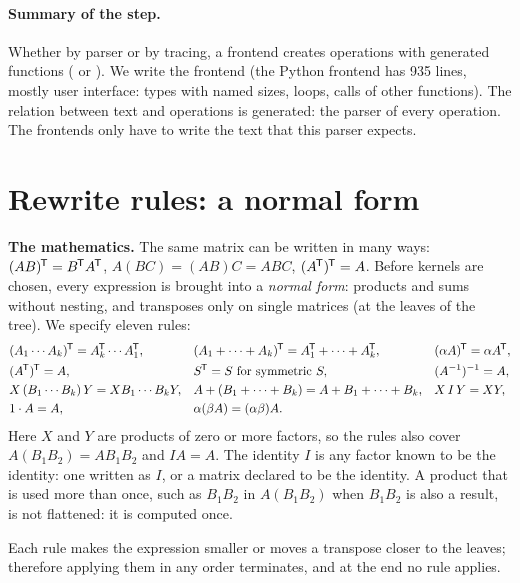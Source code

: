 \documentclass[11pt,a4paper]{article}
\newcommand{\T}{^{\mkern-1.5mu\mathsf{T}}}
\newcommand{\inv}{^{-1}}
\let\origtexttt\texttt
\renewcommand{\texttt}[1]{\highLight[ttbg]{\origtexttt{#1}}}
\newenvironment{maths}{\par\medskip\noindent\begin{minipage}{\linewidth}%
  \setlength{\parskip}{\medskipamount}\sffamily\small
  \textbf{The mathematics.}\enspace}{\end{minipage}\par\medskip}
\begin{document}
\paragraph{Summary of the step.}
Whether by parser or by tracing, a frontend creates operations with
generated functions (\texttt{create} or \texttt{parse}). We write the
frontend (the Python frontend has 935 lines, mostly user interface: types
with named sizes, loops, calls of other functions). The relation between
text and operations is generated: the parser of every operation. The
frontends only have to write the text that this parser expects.

\section{Rewrite rules: a normal form}
\label{sec:rules}

\begin{maths}
The same matrix can be written in many ways: \((AB)\T = B\T A\T\), \(A(BC) =
(AB)C = ABC\), \((A\T)\T = A\). Before kernels are chosen, every expression
is brought into a \emph{normal form}: products and sums without nesting,
and transposes only on single matrices (at the leaves of the tree). We
specify eleven rules:
\begin{align*}
&(A_1\cdots A_k)\T = A_k\T\cdots A_1\T, &&
(A_1+\dots+A_k)\T = A_1\T+\dots+A_k\T, &&
(\alpha A)\T = \alpha A\T,\\
&(A\T)\T = A, && S\T = S \text{ for symmetric } S, && (A\inv)\inv = A,\\
&X\,(B_1\cdots B_k)\,Y = X B_1\cdots B_k Y, &&
A + (B_1+\dots+B_k) = A+B_1+\dots+B_k, && X\,I\,Y = XY,\\
&1\cdot A = A, && \alpha(\beta A) = (\alpha\beta)A.
\end{align*}
Here \(X\) and \(Y\) are products of zero or more factors, so the rules also
cover \(A(B_1B_2) = AB_1B_2\) and \(IA = A\). The identity \(I\) is any factor
known to be the identity: one written as \(I\), or a matrix declared to be
the identity. A product that is used more than once, such as \(B_1B_2\) in
\(A(B_1B_2)\) when \(B_1B_2\) is also a result, is not flattened: it is
computed once.

Each rule makes the expression smaller or moves a transpose closer to the
leaves; therefore applying them in any order terminates, and at the end no
rule applies.
\end{maths}
\end{document}
